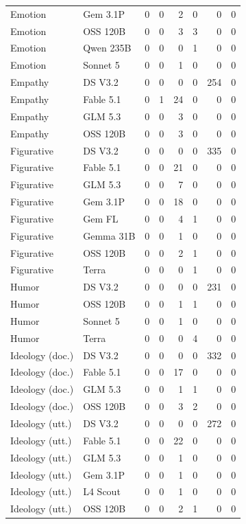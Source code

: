\begin{longtable}{llrrrrrr}
Emotion & Gem 3.1P & 0 & 0 & 2 & 0 & 0 & 0 \\
Emotion & OSS 120B & 0 & 0 & 3 & 3 & 0 & 0 \\
Emotion & Qwen 235B & 0 & 0 & 0 & 1 & 0 & 0 \\
Emotion & Sonnet 5 & 0 & 0 & 1 & 0 & 0 & 0 \\
Empathy & DS V3.2 & 0 & 0 & 0 & 0 & 254 & 0 \\
Empathy & Fable 5.1 & 0 & 1 & 24 & 0 & 0 & 0 \\
Empathy & GLM 5.3 & 0 & 0 & 3 & 0 & 0 & 0 \\
Empathy & OSS 120B & 0 & 0 & 3 & 0 & 0 & 0 \\
Figurative & DS V3.2 & 0 & 0 & 0 & 0 & 335 & 0 \\
Figurative & Fable 5.1 & 0 & 0 & 21 & 0 & 0 & 0 \\
Figurative & GLM 5.3 & 0 & 0 & 7 & 0 & 0 & 0 \\
Figurative & Gem 3.1P & 0 & 0 & 18 & 0 & 0 & 0 \\
Figurative & Gem FL & 0 & 0 & 4 & 1 & 0 & 0 \\
Figurative & Gemma 31B & 0 & 0 & 1 & 0 & 0 & 0 \\
Figurative & OSS 120B & 0 & 0 & 2 & 1 & 0 & 0 \\
Figurative & Terra & 0 & 0 & 0 & 1 & 0 & 0 \\
Humor & DS V3.2 & 0 & 0 & 0 & 0 & 231 & 0 \\
Humor & OSS 120B & 0 & 0 & 1 & 1 & 0 & 0 \\
Humor & Sonnet 5 & 0 & 0 & 1 & 0 & 0 & 0 \\
Humor & Terra & 0 & 0 & 0 & 4 & 0 & 0 \\
Ideology (doc.) & DS V3.2 & 0 & 0 & 0 & 0 & 332 & 0 \\
Ideology (doc.) & Fable 5.1 & 0 & 0 & 17 & 0 & 0 & 0 \\
Ideology (doc.) & GLM 5.3 & 0 & 0 & 1 & 1 & 0 & 0 \\
Ideology (doc.) & OSS 120B & 0 & 0 & 3 & 2 & 0 & 0 \\
Ideology (utt.) & DS V3.2 & 0 & 0 & 0 & 0 & 272 & 0 \\
Ideology (utt.) & Fable 5.1 & 0 & 0 & 22 & 0 & 0 & 0 \\
Ideology (utt.) & GLM 5.3 & 0 & 0 & 1 & 0 & 0 & 0 \\
Ideology (utt.) & Gem 3.1P & 0 & 0 & 1 & 0 & 0 & 0 \\
Ideology (utt.) & L4 Scout & 0 & 0 & 1 & 0 & 0 & 0 \\
Ideology (utt.) & OSS 120B & 0 & 0 & 2 & 1 & 0 & 0 \\

\end{longtable}
